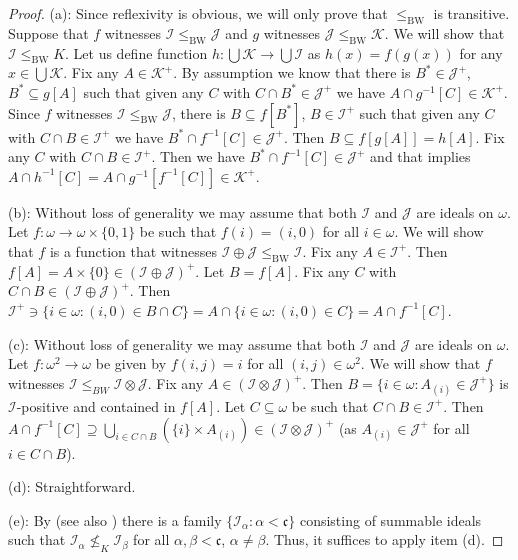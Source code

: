 \documentclass{amsart}
\theoremstyle{plain}
\theoremstyle{definition}
\theoremstyle{remark}
\newcommand{\cI}{\mathcal{I}}
\newcommand{\I}{\cI}
\newcommand{\cJ}{\mathcal{J}}
\newcommand{\J}{\cJ}
\newcommand{\cK}{\mathcal{K}}
\newcommand{\K}{\cK}
\newcommand{\cc}{\mathfrak{c}}
\newcommand{\BW}{\mathrm{BW}}
\begin{document}
\begin{proof}
(a): Since reflexivity is obvious, we will only prove that $\leq_{\BW}$ is transitive. Suppose that $f$ witnesses $\I \leq_\BW\J$ and $g$ witnesses $\J \leq_\BW \K$. We will show that $\I \leq_\BW K$. Let us define function $h: \bigcup \K \rightarrow \bigcup
\I$ as $h(x)=f(g(x))$ for any $x \in \bigcup \K$. Fix any $A \in \K^+$. By assumption we know that there is $B^* \in \J^+$, $B^* \subseteq g[A]$ such that given any $C$ with $C\cap B^*\in\J^+$ we have $A\cap g^{-1}[C]\in\K^+$. Since $f$ witnesses $\I \leq_\BW\J$, there is $B \subseteq f[B^*]$, $ B \in \I^+$ such that given any $C$ with $C\cap B\in\I^+$ we have $B^*\cap f^{-1}[C]\in\J^+$. Then $B \subseteq f[g[A]]=h[A]$. Fix any $C$ with $C \cap B \in \I^+$. Then we have $B^* \cap f^{-1}[C]\in \J^+$ and that implies $A \cap h^{-1}[C] = A \cap g^{-1}[f^{-1}[C]] \in \K^+$.

\medskip

(b): Without loss of generality we may assume that both $\I$ and $\J$ are ideals on $\omega$.
Let $f:\omega \to \omega\times\{0,1\}$ be such that $f(i)=(i,0)$ for all $i \in \omega$. We will show that $f$ is a function that witnesses $\I \oplus \J\leq_\BW \I$. Fix any $A \in \I^+$. Then $f[A]=A\times\{0\}\in (\I\oplus\J)^+$. Let $B=f[A]$. Fix any $C$ with $C\cap B \in (\I\oplus\J)^+$. Then $\I^+\ni\{i\in\omega:(i,0)\in B\cap C\}=A\cap\{i\in \omega:(i,0)\in C\}=A\cap f^{-1}[C]$.
 
\medskip

(c): Without loss of generality we may assume that both $\I$ and $\J$ are ideals on $\omega$.
Let $f:\omega^2\to\omega$ be given by $f(i,j)=i$ for all $(i,j)\in\omega^2$. We will show that $f$ witnesses $\I\leq_{BW}\I\otimes\J$. Fix any $A\in(\I \otimes\J)^+$. Then $B=\{i\in\omega: A_{(i)}\in\J^+\}$ is $\I$-positive and contained in $f[A]$. Let $C\subseteq\omega$ be such that $C\cap B\in\I^+$. Then $A\cap f^{-1}[C]\supseteq \bigcup_{i\in C\cap B}(\{i\}\times A_{(i)})\in(\I \otimes\J)^+$ (as $A_{(i)}\in\J^+$ for all $i\in C\cap B$).

\medskip

(d): Straightforward.

\medskip

(e): By \cite[Theorem 1]{GuzmanMeza} (see also \cite[Corollary 3.6]{Nikodem}) there is a family $\{\I_\alpha:\alpha<\cc\}$ consisting of summable ideals such that $\I_\alpha\not\leq_K\I_\beta$ for all $\alpha,\beta<\cc$, $\alpha\neq\beta$. Thus, it suffices to apply item (d).


\end{proof}
\end{document}
